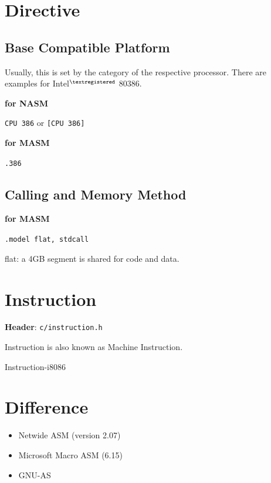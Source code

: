


\section{Directive}



\subsection{Base Compatible Platform}

Usually, this is set by the category of the respective processor. There are examples for Intel$^{\textregistered}$
80386.

\textbf{for NASM}

\texttt{CPU 386} or \texttt{[CPU 386]}

\textbf{for MASM}

\texttt{.386}



\subsection{Calling and Memory Method}

\textbf{for MASM}

\verb|.model flat, stdcall|

flat: a 4GB segment is shared for code and data.



\section{Instruction}

\textbf{Header}: \verb|c/instruction.h|

Instruction is also known as Machine Instruction.

{Instruction-i8086}



\section{Difference}

\begin{itemize}

\item Netwide ASM (version 2.07)
\item Microsoft Macro ASM (6.15)
\item GNU-AS
\end{itemize}

